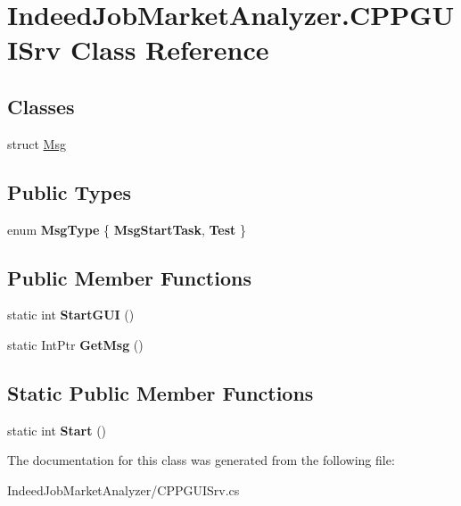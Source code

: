 \hypertarget{class_indeed_job_market_analyzer_1_1_c_p_p_g_u_i_srv}{}\section{Indeed\+Job\+Market\+Analyzer.\+C\+P\+P\+G\+U\+I\+Srv Class Reference}
\label{class_indeed_job_market_analyzer_1_1_c_p_p_g_u_i_srv}
\subsection*{Classes}
\begin{DoxyCompactItemize}
\item 
struct \hyperlink{struct_indeed_job_market_analyzer_1_1_c_p_p_g_u_i_srv_1_1_msg}{Msg}
\end{DoxyCompactItemize}
\subsection*{Public Types}
\begin{DoxyCompactItemize}
\item 
\hypertarget{class_indeed_job_market_analyzer_1_1_c_p_p_g_u_i_srv_ab547cff8df9c24bef0bfcc395f5d906d}{}enum {\bfseries Msg\+Type} \{ {\bfseries Msg\+Start\+Task}, 
{\bfseries Test}
 \}\label{class_indeed_job_market_analyzer_1_1_c_p_p_g_u_i_srv_ab547cff8df9c24bef0bfcc395f5d906d}

\end{DoxyCompactItemize}
\subsection*{Public Member Functions}
\begin{DoxyCompactItemize}
\item 
\hypertarget{class_indeed_job_market_analyzer_1_1_c_p_p_g_u_i_srv_a060a68719ed82bb2e2ff1ffeeaad3e75}{}static int {\bfseries Start\+G\+U\+I} ()\label{class_indeed_job_market_analyzer_1_1_c_p_p_g_u_i_srv_a060a68719ed82bb2e2ff1ffeeaad3e75}

\item 
\hypertarget{class_indeed_job_market_analyzer_1_1_c_p_p_g_u_i_srv_ae57ca9eb913bc4b1d405aa91ab8fac10}{}static Int\+Ptr {\bfseries Get\+Msg} ()\label{class_indeed_job_market_analyzer_1_1_c_p_p_g_u_i_srv_ae57ca9eb913bc4b1d405aa91ab8fac10}

\end{DoxyCompactItemize}
\subsection*{Static Public Member Functions}
\begin{DoxyCompactItemize}
\item 
\hypertarget{class_indeed_job_market_analyzer_1_1_c_p_p_g_u_i_srv_aeb963682f6d54395eb25ce13213d2510}{}static int {\bfseries Start} ()\label{class_indeed_job_market_analyzer_1_1_c_p_p_g_u_i_srv_aeb963682f6d54395eb25ce13213d2510}

\end{DoxyCompactItemize}


The documentation for this class was generated from the following file\+:\begin{DoxyCompactItemize}
\item 
Indeed\+Job\+Market\+Analyzer/C\+P\+P\+G\+U\+I\+Srv.\+cs\end{DoxyCompactItemize}
